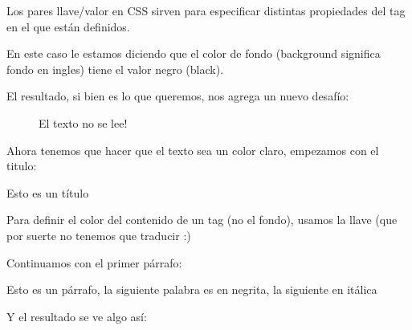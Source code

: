 \documentclass[letterpaper,10pt,spanish]{sphinxmanual}
\begin{document}
Los pares llave/valor en CSS sirven para especificar distintas propiedades del
tag en el que están definidos.

En este caso le estamos diciendo que el color de fondo  (background significa
fondo en ingles) tiene el valor negro (black).

El resultado, si bien es lo que queremos, nos agrega un nuevo desafío:

\begin{figure}[htbp]
\centering
\capstart

\noindent{}
\caption{El texto no se lee!}\label{\detokenize{css-y-cosas-por-el-estilo:id1}}\end{figure}

Ahora tenemos que hacer que el texto sea un color claro, empezamos con el titulo:

%
\begin{sphinxVerbatim}[commandchars=\\\{\}]
 Esto es un título
\end{sphinxVerbatim}

Para definir el color del contenido de un tag (no el fondo), usamos la llave
 (que por suerte no tenemos que traducir :)

Continuamos con el primer párrafo:

%
\begin{sphinxVerbatim}[commandchars=\\\{\}]
 Esto es un párrafo, la siguiente palabra es en negrita, la siguiente en itálica
\end{sphinxVerbatim}

Y el resultado se ve algo así:

\begin{figure}[htbp]
\centering

\noindent{}
\end{figure}
\end{document}
